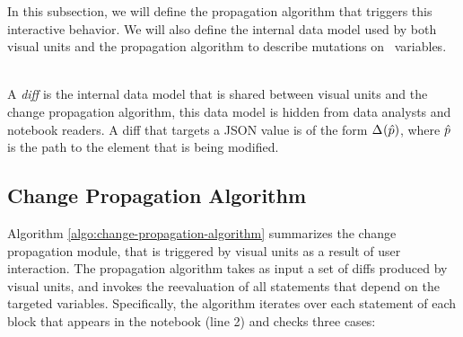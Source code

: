 In this subsection, we will define the propagation algorithm that triggers this interactive behavior. We will also define the internal data model used by both visual units and the propagation algorithm to describe mutations on \projname\ variables.

 \\A \emph{diff} is the internal data model that is shared between visual units and the change propagation algorithm, this data model is hidden from data analysts and notebook readers. A diff that targets a JSON value is of the form $\Delta^{}_{}(\hat{p})$, where $\hat{p}$ is the path to the element that is being modified. 

\subsection{Change Propagation Algorithm}
\label{section:change-propagation-algorithm}

Algorithm \ref{algo:change-propagation-algorithm} summarizes the change propagation module, that is triggered by visual units as a result of user interaction. The propagation algorithm takes as input a set of diffs produced by visual units, and invokes the reevaluation of all statements that depend on the targeted variables. Specifically, the algorithm iterates over each statement of each block that appears in the notebook (line 2) and checks three cases:

